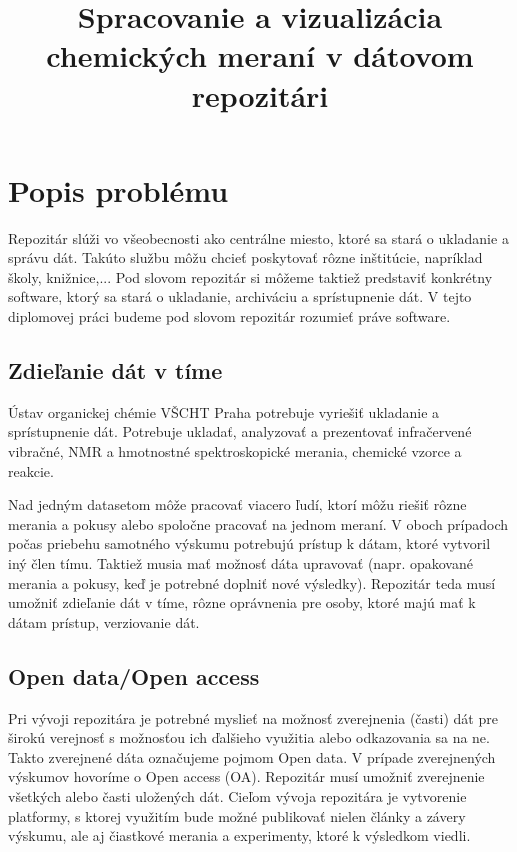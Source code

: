 \documentclass[thesis=M,slovak]{FITthesis}[2013/05/06]
\title{Spracovanie a vizualizácia chemických meraní v dátovom repozitári}
\begin{document}

\begin{introduction}
\end{introduction}

\chapter{Popis problému}
Repozitár slúži vo všeobecnosti ako centrálne miesto, ktoré sa stará o ukladanie a správu dát. Takúto službu môžu chcieť poskytovať rôzne inštitúcie, napríklad školy, knižnice,... Pod slovom repozitár si môžeme taktiež predstaviť konkrétny software, ktorý sa stará o ukladanie, archiváciu a sprístupnenie dát. V tejto diplomovej práci budeme pod slovom repozitár rozumieť práve software.

\section{Zdieľanie dát v tíme}
Ústav organickej chémie VŠCHT Praha potrebuje vyriešiť ukladanie a sprístupnenie dát. Potrebuje ukladať, analyzovať a prezentovať infračervené vibračné, NMR a hmotnostné spektroskopické merania, chemické vzorce a reakcie.

Nad jedným datasetom môže pracovať viacero ľudí, ktorí môžu riešiť rôzne merania a pokusy alebo spoločne pracovať na jednom meraní. V oboch prípadoch počas priebehu samotného výskumu potrebujú prístup k dátam, ktoré vytvoril iný člen tímu. Taktiež musia mať možnosť dáta upravovať (napr. opakované merania a pokusy, keď je potrebné doplniť nové výsledky). Repozitár teda musí umožniť zdieľanie dát v tíme, rôzne oprávnenia pre osoby, ktoré majú mať k dátam prístup, verziovanie dát.

\section{Open data/Open access}
Pri vývoji repozitára je potrebné myslieť na možnosť zverejnenia (časti) dát pre širokú verejnosť s možnosťou ich ďalšieho využitia alebo odkazovania sa na ne. Takto zverejnené dáta označujeme pojmom Open data. V prípade zverejnených výskumov hovoríme o Open access (OA). Repozitár musí umožniť zverejnenie všetkých alebo časti uložených dát. Cieľom vývoja repozitára je vytvorenie platformy, s ktorej využitím bude možné publikovať nielen články a závery výskumu, ale aj čiastkové merania a experimenty, ktoré k výsledkom viedli.
\end{document}
